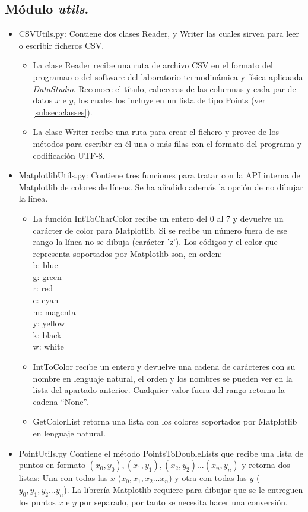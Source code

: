 	\subsection{Módulo \emph{utils}.}
	\begin{itemize}
		\item CSVUtils.py: Contiene dos clases Reader, y Writer las cuales sirven para leer o escribir ficheros CSV.
		\begin{itemize}
			\item La clase Reader recibe una ruta de archivo CSV en el formato del programao o del software del laboratorio termodinámica y física aplicaada \emph{DataStudio}. Reconoce el título, cabeceras de las columnas y cada par de datos $ x $ e $ y $, los cuales los incluye en un lista de tipo Points (ver \autoref{subsec:classes}).
		
			\item La clase Writer recibe una ruta para crear el fichero y provee de los métodos para escribir en él una o más filas con el formato del programa y codificación UTF-8.
		\end{itemize}		
		
		\item MatplotlibUtils.py: Contiene tres funciones para tratar con la API interna de Matplotlib de colores de líneas. Se ha añadido además la opción de no dibujar la línea.
		\begin{itemize}
			\item La función IntToCharColor recibe un entero del 0 al 7 y devuelve un carácter de color para Matplotlib. Si se recibe un número fuera de ese rango la línea no se dibuja (carácter 'z'). Los códigos y el color que representa soportados por Matplotlib son, en orden:\\
			b: blue\\
			g: green\\
			r: red\\
			c: cyan\\
			m: magenta\\
			y: yellow\\
			k: black\\
			w: white
			
			\item IntToColor recibe un entero y devuelve una cadena de carácteres con su nombre en lenguaje natural, el orden y los nombres se pueden ver en la lista del apartado anterior. Cualquier valor fuera del rango retorna la cadena ``None''.
			
			\item GetColorList retorna una lista con los colores soportados por Matplotlib en lenguaje natural.
		\end{itemize}
		
		\item PointUtils.py Contiene el método PointsToDoubleLists que recibe una lista de puntos en formato $ (x_0,y_0),(x_1,y_1),(x_2,y_2)...(x_n,y_n) $ y retorna dos listas: Una con todas las $ x $ ($ x_0,x_1,x_2...x_n $) y otra con todas las $ y $ ($ y_0,y_1,y_2...y_n $). La librería Matplotlib requiere para dibujar que se le entreguen los puntos $ x $ e $ y $ por separado, por tanto se necesita hacer una conversión.
	\end{itemize}
	
